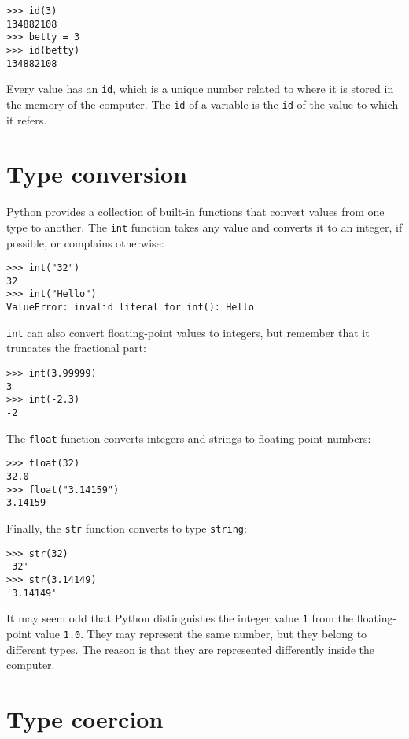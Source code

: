 \beforeverb
\begin{verbatim}
>>> id(3)
134882108
>>> betty = 3
>>> id(betty)
134882108
\end{verbatim}
\afterverb
%
Every value has an {\tt id}, which is a unique number related to where
it is stored in the memory of the computer.  The {\tt id} of a
variable is the {\tt id} of the value to which it refers.



\section{Type conversion}

Python provides a collection of built-in functions that convert values
from one type to another.  The {\tt int} function takes any value and
converts it to an integer, if possible, or complains otherwise:

\beforeverb
\begin{verbatim}
>>> int("32")
32
>>> int("Hello")
ValueError: invalid literal for int(): Hello
\end{verbatim}
\afterverb
%
{\tt int} can also convert floating-point values to integers, but
remember that it truncates the fractional part:

\beforeverb
\begin{verbatim}
>>> int(3.99999)
3
>>> int(-2.3)
-2
\end{verbatim}
\afterverb
%
The {\tt float} function converts integers and strings to floating-point
numbers:

\beforeverb
\begin{verbatim}
>>> float(32)
32.0
>>> float("3.14159")
3.14159
\end{verbatim}
\afterverb
%
Finally, the {\tt str} function converts to
type {\tt string}:

\beforeverb
\begin{verbatim}
>>> str(32)
'32'
>>> str(3.14149)
'3.14149'
\end{verbatim}
\afterverb
%
It may seem odd that Python distinguishes the integer value {\tt 1}
from the floating-point value {\tt 1.0}.  They may represent the same
number, but they belong to different types.  The reason is that they
are represented differently inside the computer.



\section{Type coercion}


